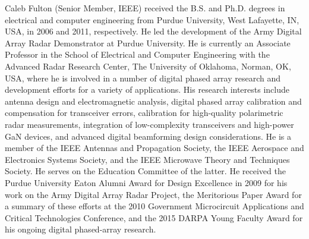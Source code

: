 \documentclass[journal]{IEEEtran}
\begin{document}
\begin{IEEEbiography}{Caleb Fulton}
(Senior Member, IEEE) received the B.S. and Ph.D. degrees in electrical and computer engineering from Purdue University, West Lafayette, IN, USA, in 2006 and 2011, respectively. He led the development of the Army Digital Array Radar Demonstrator at Purdue University. He is currently an Associate Professor in the School of Electrical and Computer Engineering with the Advanced Radar Research Center, The University of Oklahoma, Norman, OK, USA, where he is involved in a number of digital phased array research and development efforts for a variety of applications. His research interests include antenna design and electromagnetic analysis, digital phased array calibration and compensation for transceiver errors, calibration for high-quality polarimetric radar measurements, integration of low-complexity transceivers and high-power GaN devices, and advanced digital beamforming design considerations. He is a member of the IEEE Antennas and Propagation Society, the IEEE Aerospace and Electronics Systems Society, and the IEEE Microwave Theory and Techniques Society. He serves on the Education Committee of the latter. He received the Purdue University Eaton Alumni Award for Design Excellence in 2009 for his work on the Army Digital Array Radar Project, the Meritorious Paper Award for a summary of these efforts at the 2010 Government Microcircuit Applications and Critical Technologies Conference, and the 2015 DARPA Young Faculty Award for his ongoing digital phased-array research.
\end{IEEEbiography}
\end{document}
